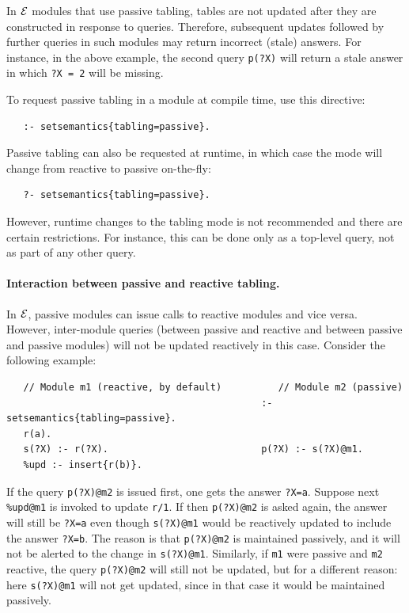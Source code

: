 \documentclass[11pt]{article}
\newcommand{\ERGO}{\mbox{\ensuremath{\cal{E}}\smaller{{\sc{RGO}}}}\xspace}
\newcommand{\FLSYSTEM}{\ERGO}
\begin{document}
In \FLSYSTEM modules that use passive tabling, tables are not updated
after they are constructed in response to queries. Therefore, subsequent
updates followed by further queries in such modules may
return incorrect (stale) answers. For instance, in the above example,
the second query \texttt{p(?X)} will return a stale answer in which 
\texttt{?X = 2} will be missing.  

To request passive tabling in a module at compile time, use this directive:
\begin{verbatim}
   :- setsemantics{tabling=passive}.
\end{verbatim}
Passive tabling can also be requested at runtime, in which case the mode
will change from reactive to passive on-the-fly:
\begin{verbatim}
   ?- setsemantics{tabling=passive}.
\end{verbatim}
However, runtime changes to the tabling mode is not recommended and there
are certain restrictions. For instance, this can be done only as a
top-level query, not as part of any other query.

\paragraph{Interaction between passive and reactive tabling.}
In \FLSYSTEM, passive modules can issue calls to reactive modules and vice
versa. However, inter-module queries (between passive and reactive
and between passive and passive modules)
will not be updated reactively in this case.
Consider the following example:
\begin{verbatim}
   // Module m1 (reactive, by default)          // Module m2 (passive)
                                             :- setsemantics{tabling=passive}.
   r(a).                                     
   s(?X) :- r(?X).                           p(?X) :- s(?X)@m1.
   %upd :- insert{r(b)}.
\end{verbatim}
If the query \texttt{p(?X)@m2} is issued first, one gets the answer \texttt{?X=a}.
Suppose next \texttt{\%upd@m1} is invoked to update \texttt{r/1}.
If then \texttt{p(?X)@m2} is asked again, the answer will still be
\texttt{?X=a} even though \texttt{s(?X)@m1} would be reactively updated to
include the answer \texttt{?X=b}. The reason is that \texttt{p(?X)@m2} is
maintained passively, and it will not be alerted to the change in
\texttt{s(?X)@m1}. Similarly, if \texttt{m1}  were
passive and \texttt{m2} reactive, the query \texttt{p(?X)@m2} will still not be
updated, but for a different reason: here \texttt{s(?X)@m1} will not get
updated, since in that case it would be maintained passively.
\end{document}
